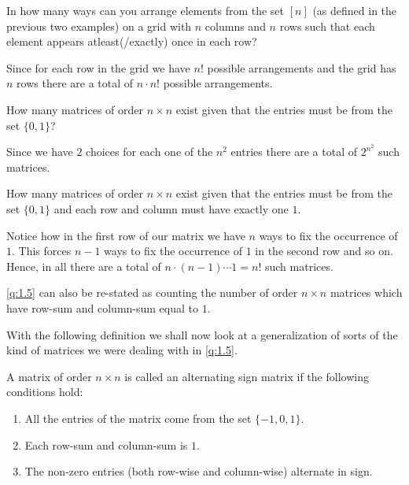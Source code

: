 \begin{question}
In how many ways can you arrange elements from the set $[n]$ (as defined in the previous two examples) on a grid with $n$ columns and $n$ rows such that each element appears atleast(/exactly) once in each row?
\end{question}

    Since for each row in the grid we have $n!$ possible arrangements and the grid has $n$ rows there are a total of $n\cdot n!$ possible arrangements.

\begin{question}
    How many matrices of order $n\times n$ exist given that the entries must be from the set $\{0,1\}$? 
\end{question}
	Since we have $2$ choices for each one of the $n^2$ entries there are a total of $2^{n^2}$ such matrices.

	\begin{question}
\label{q:1.5}
	How many matrices of order $n \times n$ exist given that the entries must be from the set $\{0,1\}$ and each row and column must have exactly one $1$.
\end{question}

Notice how in the first row of our matrix we have $n$ ways to fix the occurrence of $1$. This forces $n-1$ ways to fix the occurrence of $1$ in the second row and so on. Hence, in all there are a total of $n\cdot \left( n-1 \right) \cdots 1 = n!$ such matrices.

\begin{remark}
\cref{q:1.5} can also be re-stated as counting the number of order $n\times n$ matrices which have row-sum and column-sum equal to $1$.    
\end{remark}

With the following definition we shall now look at a generalization of sorts of the kind of matrices we were dealing with in \cref{q:1.5}.

\begin{definition}
	A matrix of order $n\times n$ is called an alternating sign matrix if the following conditions hold:
	\begin{enumerate}
		\item All the entries of the matrix come from the set $\{-1,0,1\}$.
		\item Each row-sum and column-sum is $1$.
		\item The non-zero entries (both row-wise and column-wise) alternate in sign.
	\end{enumerate}
\end{definition}

